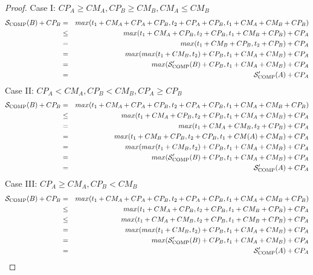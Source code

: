 \documentclass[runningheads]{llncs} %
\newcommand{\scomp}{\ensuremath{{\cal S}_{\text{COMP}}}}
\begin{document}
\begin{proof}
	Case I: $CP_A \ge CM_A, CP_B \ge CM_B, CM_A \le CM_B$
	\begin{eqnarray*}
		\scomp(B) + CP_B & = & max(t_1 + CM_A + CP_A + CP_B, t_2 + CP_A + CP_B, t_1 + CM_A + CM_B + CP_B)\\
		& \le& max(t_1 + CM_A + CP_B, t_2  + CP_B, t_1  + CM_B + CP_B) + CP_A\\
		& = & max( t_1  + CM_B + CP_B, t_2  + CP_B) + CP_A \\
		& = & max(max(t_1 + CM_B, t_2) + CP_B, t_1 + CM_A + CM_B) + CP_A\\
		& = & max(\scomp'(B) + CP_B, t_1 + CM_A + CM_B) + CP_A \\
		& = & \scomp'(A) + CP_A
	\end{eqnarray*}
	Case II: $CP_A < CM_A, CP_B < CM_B, CP_A \ge CP_B$
	\begin{eqnarray*}
		\scomp(B) + CP_B & = & max(t_1 + CM_A + CP_A + CP_B, t_2 + CP_A + CP_B, t_1 + CM_A + CM_B + CP_B)\\
		& \le & max(t_1 + CM_A + CP_B, t_2+CP_B, t_1 + CM_A + CM_B) + CP_A\\
		& = & max(t_1 + CM_A + CM_B, t_2+ CP_B) + CP_A \\
		& = & max(t_1 + CM_B + CP_B, t_2 + CP_B, t_1 + CM(A) + CM_B) + CP_A \\
		& = & max(max(t_1 + CM_B, t_2) + CP_B, t_1 + CM_A + CM_B) + CP_A \\
		& = & max(\scomp'(B) + CP_B, t_1 + CM_A +CM_B) + CP_A \\
		& = & \scomp'(A) + CP_A
	\end{eqnarray*}
	Case III: $CP_A \ge CM_A, CP_B < CM_B$
	\begin{eqnarray*}
		\scomp(B) + CP_B & = & max(t_1 + CM_A + CP_A + CP_B, t_2 + CP_A + CP_B, t_1 + CM_A + CM_B + CP_B)\\
		& \le & max(t_1 + CM_A + CP_B, t_2 + CP_B, t_1 + CM_B + CP_B) + CP_A\\
		& \le & max(t_1 + CM_A + CM_B, t_2 + CP_B, t_1 + CM_B + CP_B) + CP_A \\
		& = & max(max(t_1 + CM_B, t_2) + CP_B, t_1 + CM_A + CM_B) + CP_A \\
		& = & max(\scomp'(B) + CP_B, t_1 + CM_A +CM_B) + CP_A \\
		& = & \scomp'(A) + CP_A
	\end{eqnarray*}
\end{proof}
\end{document}
